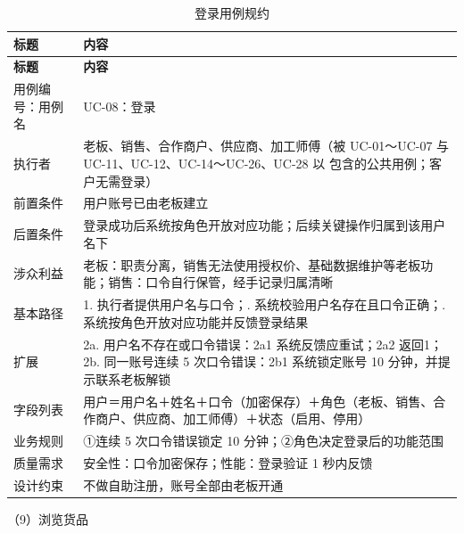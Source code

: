 {\small
\begin{longtable}{@{}L{3.0cm} L{12.3cm}@{}}
\caption{登录用例规约}\label{tab:uc-08}\\
\toprule
\textbf{标题} & \textbf{内容} \\
\midrule
\endfirsthead
\toprule
\textbf{标题} & \textbf{内容} \\
\midrule
\endhead
用例编号：用例名 & UC-08：登录 \\
\midrule
执行者 & 老板、销售、合作商户、供应商、加工师傅（被 UC-01～UC-07 与 UC-11、UC-12、UC-14～UC-26、UC-28 以  包含的公共用例；客户无需登录） \\
\midrule
前置条件 & 用户账号已由老板建立 \\
\midrule
后置条件 & 登录成功后系统按角色开放对应功能；后续关键操作归属到该用户名下 \\
\midrule
涉众利益 & 老板：职责分离，销售无法使用授权价、基础数据维护等老板功能；\newline 销售：口令自行保管，经手记录归属清晰 \\
\midrule
基本路径 & 1. 执行者提供用户名与口令；. 系统校验用户名存在且口令正确；. 系统按角色开放对应功能并反馈登录结果 \\
\midrule
扩展 & 2a. 用户名不存在或口令错误：2a1 系统反馈应重试；2a2 返回1；\newline 2b. 同一账号连续 5 次口令错误：2b1 系统锁定账号 10 分钟，并提示联系老板解锁 \\
\midrule
字段列表 & 用户＝用户名＋姓名＋口令（加密保存）＋角色（老板、销售、合作商户、供应商、加工师傅）＋状态（启用、停用） \\
\midrule
业务规则 & ①连续 5 次口令错误锁定 10 分钟；\newline ②角色决定登录后的功能范围 \\
\midrule
质量需求 & 安全性：口令加密保存；\newline 性能：登录验证 1 秒内反馈 \\
\midrule
设计约束 & 不做自助注册，账号全部由老板开通 \\
\midrule
\bottomrule
\end{longtable}}
\noindent（9）浏览货品

